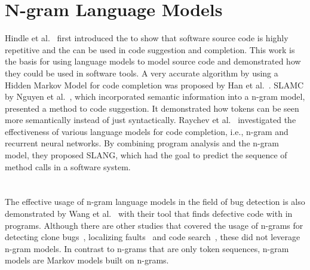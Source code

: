 \section{N-gram Language Models}\label{sec:language-models}
Hindle et al.~\cite{naturalness} first introduced the \ngram{} to show that software source code is highly repetitive and the \ngram{} can be used in code suggestion and completion. This work is the basis for using language models to model source code and demonstrated how they could be used in software tools. A very accurate algorithm by using a Hidden Markov Model for code completion was proposed by Han et al.~\cite{codecompletion}. SLAMC by Nguyen et al.~\cite{SLAMC}, which incorporated semantic information into a n-gram model, presented a method to code suggestion. It demonstrated how tokens can be seen more semantically instead of just syntactically. Raychev et al.~\cite{SLANG} investigated the effectiveness of various language models for code completion, i.e., n-gram and recurrent neural networks. By combining program analysis and the n-gram model, they proposed SLANG, which had the goal to predict the sequence of method calls in a software system. 

\section{\bugram{}}
The effective usage of n-gram language models in the field of bug detection is also demonstrated by Wang et al.~\cite{bugram} with their tool \bugram{} that finds defective code with  in \java{} programs. Although there are other studies that covered the usage of n-grams for detecting clone bugs~\cite{clonebugs}, localizing faults~\cite{faults} and code search~\cite{codesearch}, these did not leverage n-gram models. In contrast to n-grams that are only token sequences, n-gram models are Markov models built on n-grams.